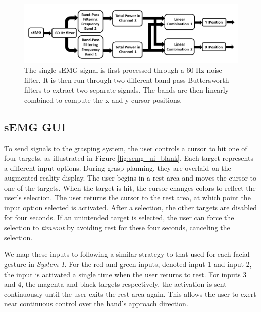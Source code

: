\begin{figure}
\centering
\includegraphics[width=.99\columnwidth]{semg_processing_pipeline.png}
\caption{The single sEMG signal is first processed through a 60 Hz noise filter. It is then run through two different band pass Buttersworth filters to extract two separate signals. The bands are then linearly combined to compute the x and y cursor positions.}
\label{fig:semg_processing_pipeline}
\end{figure}

\subsection{sEMG GUI}
To send signals to the grasping system, the user controls a cursor to hit one of four targets, as illustrated in Figure \ref{fig:semg_ui_blank}. Each target represents a different input options. During grasp planning, they are overlaid on the augmented reality display. The user begins in a rest area and moves the cursor to one of the targets. When the target is hit, the cursor changes colors to reflect the user's selection. The user returns the cursor to the rest area, at which point the input option selected is activated. After a selection, the other targets are disabled for four seconds. If an unintended target is selected, the user can force the selection to \emph{timeout} by avoiding rest for these four seconds, canceling the selection. 

We map these inputs to following a similar strategy to that used for each facial gesture in \emph{System 1}. For the red and green inputs, denoted input 1 and input 2, the input is activated a single time when the user returns to rest. For inputs 3 and 4, the magenta and black targets respectively, the activation is sent continuously until the user exits the rest area again. This allows the user to exert near continuous control over the hand's approach direction. 

